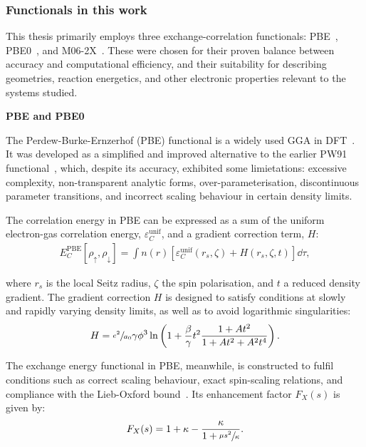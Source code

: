 \subsubsection{Functionals in this work}

This thesis primarily employs three exchange-correlation functionals:
PBE~\cite{Perdew1996}, PBE0~\cite{Adamo1999}, and M06-2X~\cite{Zhao2007}. These
were chosen for their proven balance between accuracy and computational
efficiency, and their suitability for describing geometries, reaction
energetics, and other electronic properties relevant to the systems studied.

\newpage
\noindent \textbf{PBE and PBE0}

\begin{sloppypar}
\noindent The Perdew-Burke-Ernzerhof (PBE) functional is a widely used
\gls{GGA} in \gls{DFT}~\cite{Perdew1996}. It was developed as a simplified and
improved alternative to the earlier PW91 functional~\cite{burke1998derivation},
which, despite its accuracy, exhibited some limietations: excessive complexity,
non-transparent analytic forms, over-parameterisation, discontinuous parameter
transitions, and incorrect scaling behaviour in certain density limits.
\end{sloppypar}

The correlation energy in PBE can be expressed as a sum of the uniform
electron-gas correlation energy, $\varepsilon_C^{\mathrm{unif}}$, and a
gradient correction term, $H$:
%
\begin{align}
  E_C^{\mathrm{PBE}}[\rho_{\uparrow}, \rho_{\downarrow}] =
    \int n(r)\left[\varepsilon_C^{\mathrm{unif}}(r_s,\zeta) + H(r_s,\zeta,t)\right]\dd\tau,
\end{align}

\vspace{-0.7em}%
\noindent where $r_s$ is the local Seitz radius, $\zeta$ the spin polarisation,
and $t$ a reduced density gradient. The gradient correction $H$ is designed
to satisfy conditions at slowly and rapidly varying density limits, as well as
to avoid logarithmic singularities:
%
\begin{align}
  H = \sfrac{e^2}{a_0}\gamma\phi^3 \ln
    \left(1 + \frac\beta\gamma t^2 \frac{1+At^2}{1+At^2+A^2t^4}\right).
\end{align}

\vspace{-0.7em}%
The exchange energy functional in PBE, meanwhile, is constructed to fulfil
conditions such as correct scaling behaviour, exact spin-scaling relations, and
compliance with the Lieb-Oxford bound~\cite{Lieb1979, Lieb1981}. Its
enhancement factor $F_X(s)$ is given by:
%
\begin{align}
  F_X(s) = 1 + \kappa - \frac\kappa{1 + \sfrac{\mu s^2}{\kappa}}.
\end{align}

